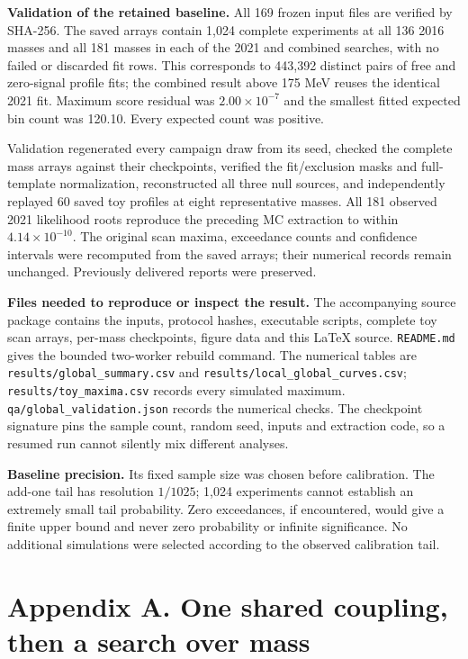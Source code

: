 \documentclass[11pt]{article}
\begin{document}
\textbf{Validation of the retained baseline.} All 169 frozen input files are verified by SHA-256. The saved arrays contain 1,024 complete experiments at all 136 2016 masses and all 181 masses in each of the 2021 and combined searches, with no failed or discarded fit rows. This corresponds to 443,392 distinct pairs of free and zero-signal profile fits; the combined result above 175 MeV reuses the identical 2021 fit. Maximum score residual was $2.00\times10^{-7}$ and the smallest fitted expected bin count was 120.10. Every expected count was positive.

Validation regenerated every campaign draw from its seed, checked the complete mass arrays against their checkpoints, verified the fit/exclusion masks and full-template normalization, reconstructed all three null sources, and independently replayed 60 saved toy profiles at eight representative masses. All 181 observed 2021 likelihood roots reproduce the preceding MC extraction to within $4.14\times10^{-10}$. The original scan maxima, exceedance counts and confidence intervals were recomputed from the saved arrays; their numerical records remain unchanged. Previously delivered reports were preserved.

\textbf{Files needed to reproduce or inspect the result.} The accompanying source package contains the inputs, protocol hashes, executable scripts, complete toy scan arrays, per-mass checkpoints, figure data and this LaTeX source. \texttt{README.md} gives the bounded two-worker rebuild command. The numerical tables are \texttt{results/global\_summary.csv} and \texttt{results/local\_global\_curves.csv}; \texttt{results/toy\_maxima.csv} records every simulated maximum. \texttt{qa/global\_validation.json} records the numerical checks. The checkpoint signature pins the sample count, random seed, inputs and extraction code, so a resumed run cannot silently mix different analyses.

\textbf{Baseline precision.} Its fixed sample size was chosen before calibration. The add-one tail has resolution $1/1025$; 1,024 experiments cannot establish an extremely small tail probability. Zero exceedances, if encountered, would give a finite upper bound and never zero probability or infinite significance. No additional simulations were selected according to the observed calibration tail.

\clearpage\section*{Appendix A. One shared coupling, then a search over mass}
\end{document}
